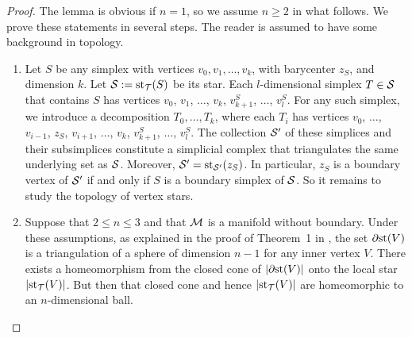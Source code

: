 \documentclass[10pt,a4paper]{article}
\begin{document}
\begin{proof}
    The lemma is obvious if $n = 1$, so we assume $n \geq 2$ in what follows. 
    We prove these statements in several steps. 
    The reader is assumed to have some background in topology. 
    \begin{enumerate}
    \item 
    Let $S$ be any simplex with vertices $v_0, v_1, \dots, v_k$, with barycenter $z_{S}$, and dimension $k$.
    Let ${\mathcal S} := \operatorname{st}_{{\mathcal T}}(S)$ be its star. 
    Each $l$-dimensional simplex $T \in {\mathcal S}$ that contains $S$ 
    has vertices $v_0$, $v_1$, $\dots$, $v_k$, $v_{k+1}^{S}$, $\dots$, $v_{l}^{S}$. 
    For any such simplex, we introduce a decomposition $T_{0}, \dots, T_{k}$, where each $T_{i}$ has vertices 
    $v_0$, $\dots$, $v_{i-1}$, $z_{S}$, $v_{i+1}$, $\dots$, $v_k$, $v_{k+1}^{S}$, $\dots$, $v_{l}^{S}$.
    The collection ${\mathcal S}'$ of these simplices and their subsimplices constitute a simplicial complex 
    that triangulates the same underlying set as ${\mathcal S}$.
    Moreover, ${\mathcal S}' = \operatorname{st}_{{\mathcal S}'}(z_{S})$. 
    In particular, $z_{S}$ is a boundary vertex of ${\mathcal S}'$ if and only if $S$ is a boundary simplex of ${\mathcal S}$. 
    So it remains to study the topology of vertex stars. 
    
    \item 
    Suppose that $2 \leq n \leq 3$ and that ${\mathcal M}$ is a manifold without boundary. 
    Under these assumptions, 
    as explained in the proof of Theorem~1 in \cite{Siebenmann1979},
    the set ${\partial \rm st}(V)$ is a triangulation of a sphere of dimension $n-1$ for any inner vertex $V$. 
    There exists a homeomorphism from the closed cone of $\left| {\partial \rm st}(V) \right|$ onto the local star $\left| \operatorname{st}_{{\mathcal T}}(V) \right|$.
    But then that closed cone and hence $\left| \operatorname{st}_{{\mathcal T}}(V) \right|$ are homeomorphic to an $n$-dimensional ball. 
    

\end{enumerate}
\end{proof}
\end{document}
